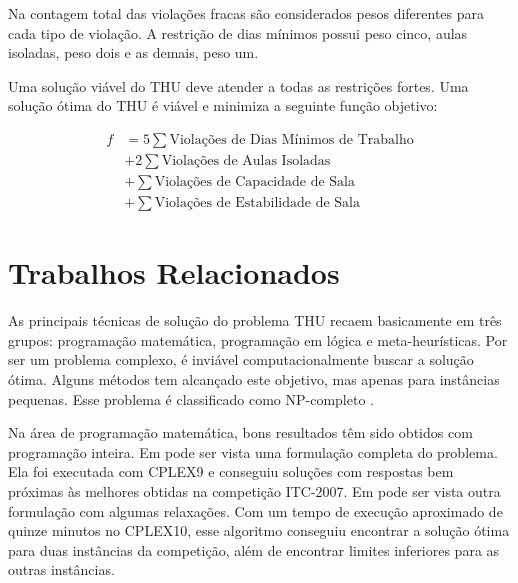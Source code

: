 \documentclass[11pt]{article}
\begin{document}
Na contagem total das violações fracas são considerados pesos diferentes para cada tipo de violação. A restrição de dias mínimos possui peso cinco, aulas isoladas, peso dois e as demais, peso um.

Uma solução viável do THU deve atender a todas as restrições fortes. Uma solução ótima do THU é viável e minimiza a seguinte função objetivo:

\begin{equation}\label{somaiai}
\begin{split}
f &= 5 \sum \text{Violações de Dias Mínimos de Trabalho} \\
 & + 2 \sum \text{Violações de Aulas Isoladas} \\
 & + \sum \text{Violações de Capacidade de Sala} \\
 & + \sum \text{Violações de Estabilidade de Sala} 
\end{split}
\end{equation}



\section{Trabalhos Relacionados}
\label{sec:trabalhos_relacionados}

As principais técnicas de solução do problema THU recaem basicamente em três grupos: programação matemática, programação em lógica e meta-heurísticas. Por ser um problema complexo, é inviável computacionalmente buscar a solução ótima. Alguns métodos tem alcançado este objetivo, mas apenas para instâncias pequenas. Esse problema é classificado como NP-completo \cite{Schaerf95asurvey}.

Na área de programação matemática, bons resultados têm sido obtidos com programação inteira. Em \cite{lach_lubbecke} pode ser vista uma formulação completa do problema. Ela foi executada com CPLEX9 e conseguiu soluções com respostas bem próximas às melhores obtidas na competição ITC-2007. Em \cite{Burke_abranch-andcut} pode ser vista outra formulação com algumas relaxações. Com um tempo de execução aproximado de quinze minutos no CPLEX10, esse algoritmo conseguiu encontrar a solução ótima para duas instâncias da competição, além de encontrar limites inferiores para as outras instâncias.
\end{document}
